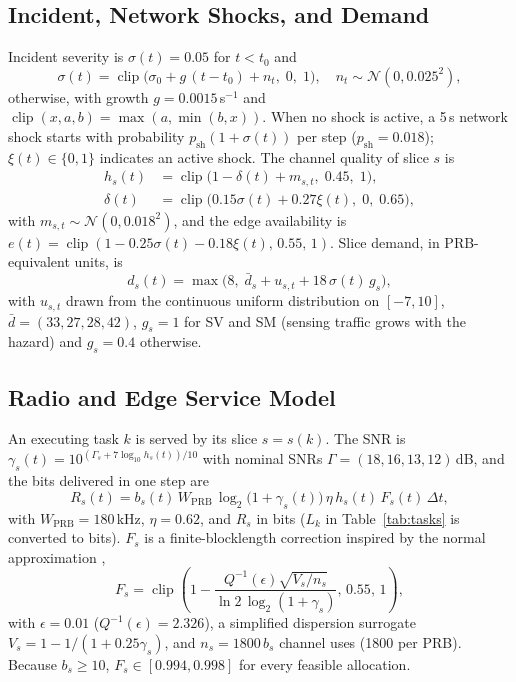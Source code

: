 \documentclass[conference]{IEEEtran}
\DeclareMathOperator{\clip}{clip}
\begin{document}
\subsection{Incident, Network Shocks, and Demand}
Incident severity is $\sigma(t)=0.05$ for $t<t_0$ and
\begin{equation}
\sigma(t)=\clip\big(\sigma_0+g\,(t-t_0)+n_t,\;0,\;1\big),\quad n_t\sim\mathcal{N}(0,0.025^2),
\label{eq:sev}
\end{equation}
otherwise, with growth $g=0.0015$\,s$^{-1}$ and $\clip(x,a,b)=\max(a,\min(b,x))$. When no shock is active, a 5\,s network shock starts with probability $p_{\mathrm{sh}}(1+\sigma(t))$ per step ($p_{\mathrm{sh}}=0.018$); $\xi(t)\in\{0,1\}$ indicates an active shock. The channel quality of slice $s$ is
\begin{equation}
\begin{aligned}
h_s(t)&=\clip\big(1-\delta(t)+m_{s,t},\;0.45,\;1\big),\\
\delta(t)&=\clip\big(0.15\sigma(t)+0.27\xi(t),\;0,\;0.65\big),
\end{aligned}
\label{eq:chan}
\end{equation}
with $m_{s,t}\sim\mathcal{N}(0,0.018^2)$, and the edge availability is $e(t)=\clip(1-0.25\sigma(t)-0.18\xi(t),\,0.55,\,1)$. Slice demand, in PRB-equivalent units, is
\begin{equation}
d_s(t)=\max\big(8,\;\bar d_s+u_{s,t}+18\,\sigma(t)\,g_s\big),
\label{eq:demand}
\end{equation}
with $u_{s,t}$ drawn from the continuous uniform distribution on $[-7,10]$, $\bar d=(33,27,28,42)$, $g_s=1$ for SV and SM (sensing traffic grows with the hazard) and $g_s=0.4$ otherwise.

\subsection{Radio and Edge Service Model}\label{sec:service}
An executing task $k$ is served by its slice $s=s(k)$. The SNR is $\gamma_s(t)=10^{(\Gamma_s+7\log_{10}h_s(t))/10}$ with nominal SNRs $\Gamma=(18,16,13,12)$\,dB, and the bits delivered in one step are
\begin{equation}
R_s(t)=b_s(t)\,W_{\mathrm{PRB}}\,\log_2\!\big(1+\gamma_s(t)\big)\,\eta\,h_s(t)\,F_s(t)\,\Delta t,
\label{eq:rate}
\end{equation}
with $W_{\mathrm{PRB}}=180$\,kHz, $\eta=0.62$, and $R_s$ in bits ($L_k$ in Table~\ref{tab:tasks} is converted to bits). $F_s$ is a finite-blocklength correction inspired by the normal approximation \cite{polyanskiy},
\begin{equation}
F_s=\clip\!\left(1-\frac{Q^{-1}(\epsilon)\sqrt{V_s/n_s}}{\ln 2\,\log_2(1+\gamma_s)},\,0.55,\,1\right),
\label{eq:fbl}
\end{equation}
with $\epsilon=0.01$ ($Q^{-1}(\epsilon)=2.326$), a simplified dispersion surrogate $V_s=1-1/(1+0.25\gamma_s)$, and $n_s=1800\,b_s$ channel uses (1800 per PRB). Because $b_s\ge10$, $F_s\in[0.994,0.998]$ for every feasible allocation.
\end{document}
